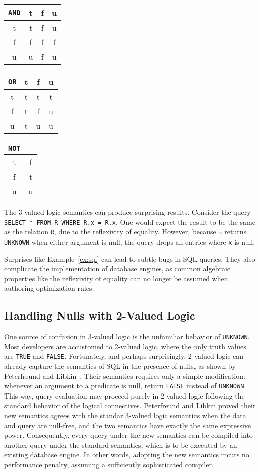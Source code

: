 \documentclass[sigconf]{acmart}
\begin{document}
\begin{tabular}{ c|ccc } 
  \lstinline|AND| & t & f & u \\ 
  \hline
  t & t & f & u \\
  f & f & f & f \\
  u & u & f & u
\end{tabular}\qquad
%
\begin{tabular}{ c|ccc } 
  \lstinline|OR| & t & f & u \\ 
  \hline
  t & t & t & t \\
  f & t & f & u \\
  u & t & u & u
\end{tabular}\qquad
%
\begin{tabular}{ c|c } 
  \lstinline|NOT| &  \\ 
  \hline
  t & f \\
  f & t \\
  u & u 
\end{tabular}\quad

\begin{example}
\label{ex:sql}
The 3-valued logic semantics can produce surprising results.
Consider the query \lstinline|SELECT * FROM R WHERE R.x = R.x|.
One would expect the result to be the same as the relation \lstinline|R|,
 due to the reflexivity of equality.
However, because \lstinline|=| returns \lstinline|UNKNOWN| 
 when either argument is null,
 the query drops all entries 
 where \lstinline|x| is null.
\end{example}

Surprises like Example~\ref{ex:sql} 
 can lead to subtle bugs in SQL queries. 
They also complicate the implementation of database engines, 
 as common algebraic properties like the reflexivity of equality
 can no longer be assumed when authoring optimization rules.

\subsection{Handling Nulls with 2-Valued Logic}

One source of confusion in 3-valued logic
 is the unfamiliar behavior of \lstinline|UNKNOWN|.
Most developers are accustomed to 2-valued logic,
 where the only truth values are \lstinline|TRUE| and \lstinline|FALSE|.
Fortunately, and perhaps surprisingly,
 2-valued logic can already capture the semantics of SQL 
 in the presence of nulls, 
 as shown by Peterfreund and Libkin~\cite{DBLP:conf/pods/LibkinP23}.
Their semantics requires only a simple modification:
 whenever an argument to a predicate is null,
 return \lstinline|FALSE| instead of \lstinline|UNKNOWN|.
This way, query evaluation may proceed purely in 2-valued logic
 following the standard behavior of the logical connectives.
Peterfreund and Libkin proved their new semantics 
 agrees with the standar 3-valued logic semantics
 when the data and query are null-free,
 and the two semantics have exactly the same expressive power.
Consequently, every query under the new semantics
 can be compiled into another query under the standard semantics,
 which is to be executed by an existing database engine.
In other words, adopting the new semantics 
 incurs no performance penalty,
 assuming a sufficiently sophisticated compiler.
\end{document}
